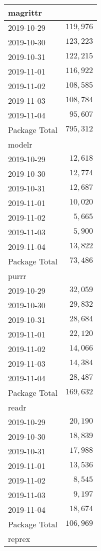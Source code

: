 \documentclass[]{article}
\begin{document}
\begin{longtable}{lr}
\midrule
\multicolumn{1}{l}{magrittr} \\ 
\midrule
2019-10-29 & $119,976$ \\ 
2019-10-30 & $123,223$ \\ 
2019-10-31 & $122,215$ \\ 
2019-11-01 & $116,922$ \\ 
2019-11-02 & $108,585$ \\ 
2019-11-03 & $108,784$ \\ 
2019-11-04 & $95,607$ \\ 
\midrule 
Package Total & $795,312$ \\ 
\midrule
\multicolumn{1}{l}{modelr} \\ 
\midrule
2019-10-29 & $12,618$ \\ 
2019-10-30 & $12,774$ \\ 
2019-10-31 & $12,687$ \\ 
2019-11-01 & $10,020$ \\ 
2019-11-02 & $5,665$ \\ 
2019-11-03 & $5,900$ \\ 
2019-11-04 & $13,822$ \\ 
\midrule 
Package Total & $73,486$ \\ 
\midrule
\multicolumn{1}{l}{purrr} \\ 
\midrule
2019-10-29 & $32,059$ \\ 
2019-10-30 & $29,832$ \\ 
2019-10-31 & $28,684$ \\ 
2019-11-01 & $22,120$ \\ 
2019-11-02 & $14,066$ \\ 
2019-11-03 & $14,384$ \\ 
2019-11-04 & $28,487$ \\ 
\midrule 
Package Total & $169,632$ \\ 
\midrule
\multicolumn{1}{l}{readr} \\ 
\midrule
2019-10-29 & $20,190$ \\ 
2019-10-30 & $18,839$ \\ 
2019-10-31 & $17,988$ \\ 
2019-11-01 & $13,536$ \\ 
2019-11-02 & $8,545$ \\ 
2019-11-03 & $9,197$ \\ 
2019-11-04 & $18,674$ \\ 
\midrule 
Package Total & $106,969$ \\ 
\midrule
\multicolumn{1}{l}{reprex} \\ 

\end{longtable}
\end{document}
